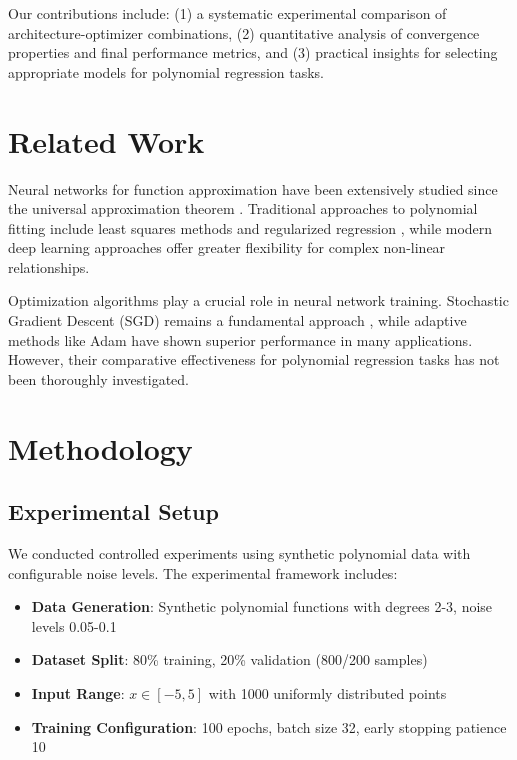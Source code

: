 \documentclass[11pt,twocolumn]{article}
\begin{document}
Our contributions include: (1) a systematic experimental comparison of architecture-optimizer combinations, (2) quantitative analysis of convergence properties and final performance metrics, and (3) practical insights for selecting appropriate models for polynomial regression tasks.

\section{Related Work}

Neural networks for function approximation have been extensively studied since the universal approximation theorem \cite{hornik1989multilayer}. Traditional approaches to polynomial fitting include least squares methods and regularized regression \cite{hastie2009elements}, while modern deep learning approaches offer greater flexibility for complex non-linear relationships.

Optimization algorithms play a crucial role in neural network training. Stochastic Gradient Descent (SGD) remains a fundamental approach \cite{robbins1951stochastic}, while adaptive methods like Adam \cite{kingma2014adam} have shown superior performance in many applications. However, their comparative effectiveness for polynomial regression tasks has not been thoroughly investigated.

\section{Methodology}

\subsection{Experimental Setup}

We conducted controlled experiments using synthetic polynomial data with configurable noise levels. The experimental framework includes:

\begin{itemize}
    \item \textbf{Data Generation}: Synthetic polynomial functions with degrees 2-3, noise levels 0.05-0.1
    \item \textbf{Dataset Split}: 80\% training, 20\% validation (800/200 samples)
    \item \textbf{Input Range}: $x \in [-5, 5]$ with 1000 uniformly distributed points
    \item \textbf{Training Configuration}: 100 epochs, batch size 32, early stopping patience 10
\end{itemize}
\end{document}
